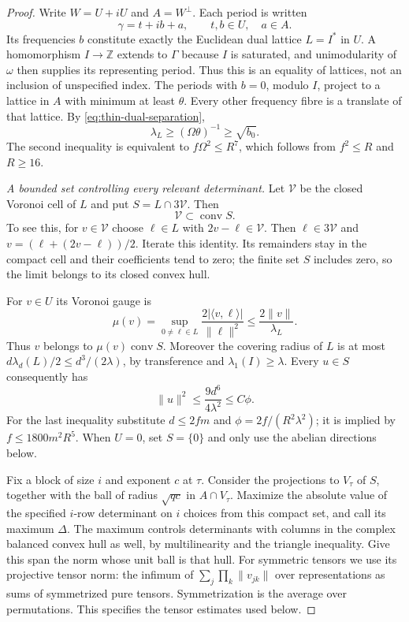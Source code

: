 \begin{proof}
Write $W=U+iU$ and $A=W^\perp$.  Each period is written
\[
                   \gamma=t+ib+a,
             \qquad t,b\in U,\quad a\in A.
\]
Its frequencies $b$ constitute exactly the Euclidean dual lattice
$L=I^*$ in $U$.  A homomorphism $I\to\mathbb Z$ extends to
$\Gamma$ because $I$ is saturated, and unimodularity of
$\omega$ then supplies its representing period.  Thus this is
an equality of lattices, not an inclusion of unspecified index.
The periods with $b=0$, modulo $I$, project to a lattice in $A$
with minimum at least $\theta$.  Every other frequency fibre is
a translate of that lattice.  By
\eqref{eq:thin-dual-separation},
\begin{equation}\label{eq:thin-frequency-minimum}
 \lambda_L\ge(\Omega\theta)^{-1}\ge\sqrt{b_0}.
\end{equation}
The second inequality is equivalent to $f\Omega^2\le R^7$,
which follows from $f^2\le R$ and $R\ge16$.

\emph{A bounded set controlling every relevant determinant.}
Let $\mathcal V$ be the closed Voronoi cell of $L$ and put
$S=L\cap3\mathcal V$.  Then
\begin{equation}\label{eq:thin-voronoi-convex}
                            \mathcal V\subset\operatorname{conv}S.
\end{equation}
To see this, for $v\in\mathcal V$ choose $\ell\in L$ with
$2v-\ell\in\mathcal V$.  Then $\ell\in3\mathcal V$ and
$v=(\ell+(2v-\ell))/2$.  Iterate this identity.  Its remainders
stay in the compact cell and their coefficients tend to zero;
the finite set $S$ includes zero, so the limit belongs to its
closed convex hull.

For $v\in U$ its Voronoi gauge is
\[
 \mu(v)=\sup_{0\ne\ell\in L}
                  \frac{2|\langle v,\ell\rangle|}{\|\ell\|^2}
                      \le\frac{2\|v\|}{\lambda_L}.
\]
Thus $v$ belongs to $\mu(v)\operatorname{conv}S$.
Moreover the covering radius of $L$ is at most
$d\lambda_d(L)/2\le d^3/(2\lambda)$, by transference and
$\lambda_1(I)\ge\lambda$.  Every $u\in S$ consequently has
\begin{equation}\label{eq:thin-frequency-radius}
 \|u\|^2\le\frac{9d^6}{4\lambda^2}\le C\phi.
\end{equation}
For the last inequality substitute $d\le2fm$ and
$\phi=2f/(R^2\lambda^2)$; it is implied by
$f\le1800m^2R^5$.  When $U=0$, set $S=\{0\}$ and only
use the abelian directions below.

Fix a block of size $i$ and exponent $c$ at $\tau$.  Consider
the projections to $V_\tau$ of $S$, together with the ball of
radius $\sqrt{qc}$ in $A\cap V_\tau$.  Maximize the absolute
value of the specified $i$-row determinant on $i$ choices from
this compact set, and call its maximum $\Delta$.  The maximum
controls determinants with columns in the complex balanced convex
hull as well, by multilinearity and the triangle inequality.
Give this span the norm whose unit ball is that hull.  For symmetric
tensors we use its projective tensor norm: the infimum of
$\sum_j\prod_k\|v_{jk}\|$ over representations as sums of
symmetrized pure tensors.  Symmetrization is the average over
permutations.  This specifies the tensor estimates used below.


\end{proof}
